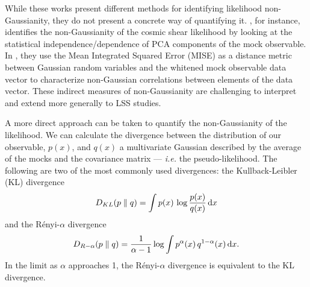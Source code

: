 \documentclass[12pt, letterpaper, preprint]{aastex}
\newcommand{\beq}{\begin{equation}}
\newcommand{\eeq}{\end{equation}}
\begin{document}
While these works present different methods for identifying 
likelihood non-Gaussianity, they do not present a concrete way of 
quantifying it. \cite{hartlap2009}, for instance, identifies the
non-Gaussianity of the cosmic shear likelihood by looking at the
statistical independence/dependence of PCA components of the mock 
observable. In \cite{sellentin2017}, they use the Mean
Integrated Squared Error (MISE) as a distance metric between 
Gaussian random variables and the whitened mock observable 
data vector to characterize non-Gaussian correlations between elements 
of the data vector. These indirect measures of non-Gaussianity 
are challenging to interpret and extend more generally to LSS studies. 

A more direct approach can be taken to quantify the 
non-Gaussianity of the likelihood. We can calculate the divergence between 
the distribution of our observable, $p(x)$, and $q(x)$ a multivariate Gaussian described 
by the average of the mocks and the covariance matrix --- \emph{i.e.} 
the pseudo-likelihood. The following are two of the most commonly used 
divergences: the Kullback-Leibler (KL) divergence
\beq \label{eq:kl} 
D_{KL} ( p \parallel q ) = \int p(x)\,\log \frac{p(x)}{q(x)}\,{\rm d}x
\eeq
and the R\'enyi-$\alpha$ divergence
\beq \label{eq:renyi}
D_{R-\alpha} ( p \parallel q ) = \frac{1}{\alpha -1} \log \int p^\alpha(x)\, q^{1 -\alpha}(x)\,{\rm d}x. 
\eeq
In the limit as $\alpha$ approaches 1, the R\'enyi-$\alpha$ divergence is
equivalent to the KL divergence.
\end{document}
